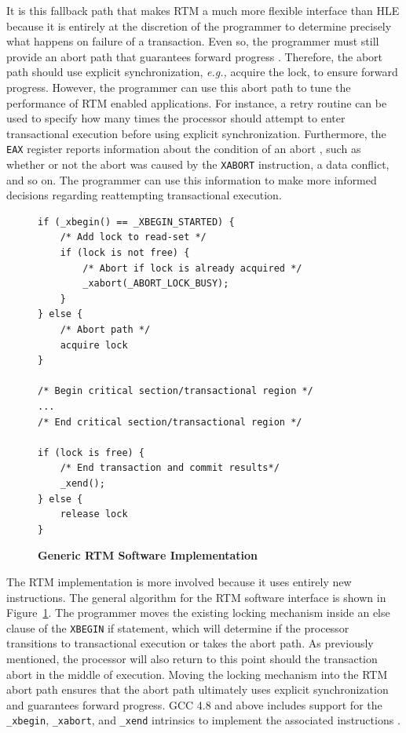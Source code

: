 \documentclass[11pt]{book}
\begin{document}
It is this fallback path that makes RTM a much more flexible interface than HLE because it
is entirely at the discretion of the programmer to determine precisely what happens on
failure of a transaction.  Even so, the programmer must still provide an abort path that
guarantees forward progress \cite{intel_prog_ref}.  Therefore, the abort path should use
explicit synchronization, \emph{e.g.,} acquire the lock, to ensure forward progress.
However, the programmer can use this abort path to tune the performance of RTM enabled
applications.  For instance, a retry routine can be used to specify how many times the
processor should attempt to enter transactional execution before using explicit
synchronization.  Furthermore, the \texttt{EAX} register reports information about the
condition of an abort \cite{intel_prog_ref}, such as whether or not the abort was caused
by the \texttt{XABORT} instruction, a data conflict, and so on.  The programmer can use
this information to make more informed decisions regarding reattempting transactional
execution.

\begin{figure}
\begin{verbatim}
if (_xbegin() == _XBEGIN_STARTED) {
    /* Add lock to read-set */
    if (lock is not free) {
        /* Abort if lock is already acquired */
        _xabort(_ABORT_LOCK_BUSY);
    }
} else {
    /* Abort path */
    acquire lock
}

/* Begin critical section/transactional region */
...
/* End critical section/transactional region */

if (lock is free) {
    /* End transaction and commit results*/
    _xend();
} else {
    release lock
}
\end{verbatim}
    \caption{\textbf{Generic RTM Software Implementation}}\label{fig:rtm_interface}
\end{figure}

The RTM implementation is more involved because it uses entirely new instructions.  The
general algorithm for the RTM software interface is shown in
Figure~\ref{fig:rtm_interface}.  The programmer moves the existing locking mechanism
inside an else clause of the \texttt{XBEGIN} if statement, which will determine if the
processor transitions to transactional execution or takes the abort path.  As previously
mentioned, the processor will also return to this point should the transaction abort in
the middle of execution.  Moving the locking mechanism into the RTM abort path ensures
that the abort path ultimately uses explicit synchronization and guarantees forward
progress.  GCC 4.8 and above includes support for the \texttt{\_xbegin},
\texttt{\_xabort}, and \texttt{\_xend} intrinsics to implement the associated instructions
\cite{gcc}.
\end{document}
